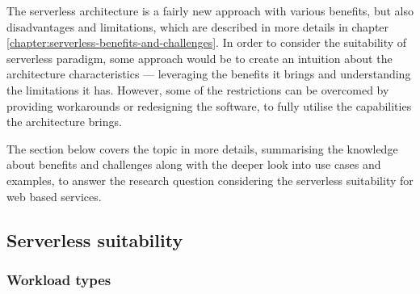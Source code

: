 The serverless architecture is a fairly new approach with various benefits, but also disadvantages and limitations, which are described in more details in chapter \ref{chapter:serverless-benefits-and-challenges}.
In order to consider the suitability of serverless paradigm, some approach would be to create an intuition about the architecture characteristics --- leveraging the benefits it brings and understanding the limitations it has.
However, some of the restrictions can be overcomed by providing workarounds or redesigning the software, to fully utilise the capabilities the architecture brings.

The section below covers the topic in more details, summarising the knowledge about benefits and challenges along with the deeper look into use cases and examples, to answer the research question considering the serverless suitability for web based services.



\subsection{Serverless suitability}

\subsubsection*{Workload types}

